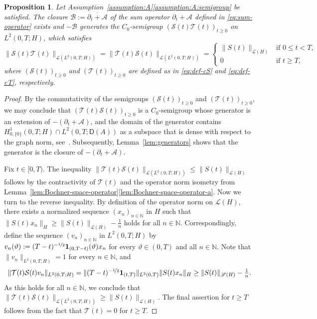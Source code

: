 \documentclass[reqno]{amsart}
\numberwithin{equation}{section}
\newcommand{\bbN}{\mathbb{N}}
\newcommand{\N}{\mathbb{N}}
\newcommand{\cA}{\mathcal{A}}
\newcommand{\cB}{\mathcal{B}}
\newcommand{\cS}{\mathcal{S}}
\newcommand{\cT}{\mathcal{T}}
\newcommand{\norm}[2]{     \| #1       \|_{ #2 }}
\newcommand{\clos}[1]{\overline{ #1 }}
\newtheorem{proposition}[lemma]{Proposition}
\theoremstyle{remark}
\theoremstyle{definition}
\begin{document}
\begin{proposition}\label{prop:parabolic-operator-semigroup}
	Let Assumption~\textup{\ref{assumption:A}\ref{assumption:A:semigroup}} 
	be satisfied. 
	The closure 
	$\cB := \clos{ \partial_t + \cA }$
	of the sum operator $\partial_t + \cA$ 
	defined in \eqref{eq:sum-operator} exists and $-\cB$
	generates the $C_0$-semigroup 
	$(\cS(t) \cT(t))_{t\geq 0}$ 
	on $L^2(0,T;H)$, 
	which satisfies 
	\[ 
	\norm{ \cS(t) \cT(t) }{\mathscr L(L^2(0,T;H))}  
	=
	\norm{ \cT(t) \cS(t) }{\mathscr L(L^2(0,T;H))}  
	= 
	\begin{cases}
	\norm{S(t)}{\mathscr L(H)}   
	& 
	\text{if } 
	0 \leq t < T, 
	\\
	0
	& 
	\text{if } 				
	t \geq T, 
	\end{cases} 
	\] 
	where $(\cS(t))_{t\geq 0}$ and $(\cT(t))_{t\geq 0}$ are defined 
	as in \eqref{eq:def-cS} and \eqref{eq:def-cT}, respectively.
\end{proposition}

\begin{proof}
	By the commutativity of the semigroups 
	$(\cS(t))_{t\geq 0}$ and $(\cT(t))_{t\geq 0}$,  
	we may conclude that $( \cT(t) \cS(t) )_{t\geq 0}$ 
	is a $C_0$-semigroup whose generator is an extension 
	of $-(\partial_t + \cA)$, 
	and the domain of the generator contains 
	$H^1_{0,\{0\}}(0,T;H) \cap L^2(0,T;\mathsf D(A))$ 
	as a subspace that is dense  
	with respect to the graph norm, 
	see~\cite[Example~II.2.7]{Engel1999}. 
	Subsequently, Lemma~\ref{lem:generators} 
	shows that the generator is 
	the closure of $-(\partial_t + \cA)$.
	
	Fix $t\in[0,T)$.  
	The inequality 
	$\norm{ \cT(t) \cS(t) }{\mathscr L(L^2(0,T;H))} 
	\leq \norm{S(t)}{\mathscr L(H)}$ 
	follows by the contractivity of $\cT(t)$ 
	and the operator norm isometry from    
	Lemma~\ref{lem:Bochner-space-operator}\ref{lem:Bochner-space-operator-a}. 
	Now we turn to the reverse inequality. 
	By definition of the operator norm on $\mathscr L(H)$, 
	there exists a normalized sequence 
	$(x_n)_{n\in\bbN}$ in $H$ 
	such that 
	$\norm{S(t)x_n}{H} \geq \norm{S(t)}{\mathscr L(H)} - \frac{1}{n}$  
	holds for all $n\in\bbN$. 
	Correspondingly, 
	define 
	the sequence $(v_n)_{n\in\bbN}$  
	in $L^2(0,T;H)$ by 
	$v_n(\vartheta) 
	:= 
	(T-t)^{-\nicefrac{1}{2}} \mathbf 1_{(0,T-t)}(\vartheta) x_n$ 
	for every $\vartheta\in(0,T)$ and all $n\in\N$. 
	Note that 
	$\norm{v_n}{L^2(0,T;H)} = 1$  
	for every $n \in \N$, 
	and 
	\[
	\norm{ \cT(t) \cS(t) v_n}{L^2(0,T;H)} 
	= 
	\norm{(T-t)^{-\nicefrac{1}{2}}\mathbf 1_{(t,T)}}{L^2(0,T)} 
	\norm{S(t)x_n}{H} 
	\geq 
	\norm{S(t)}{\mathscr L(H)} - \tfrac{1}{n}.
	\] 
	As this holds for all $n \in \N$, we conclude that 
	$\norm{ \cT(t) \cS(t)}{\mathscr L(L^2(0,T;H))} 
	\geq \norm{S(t)}{\mathscr L(H)}$.
	The final assertion for $t\geq T$ 
	follows from the fact 
	that $\cT(t) = 0$ for $t \geq T$.
\end{proof}
\end{document}
